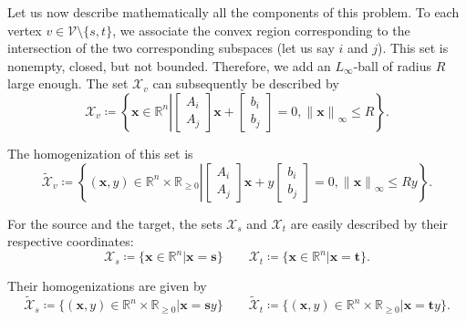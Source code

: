 \documentclass[a4paper, 12pt]{article}
\newlength{\indentsize}
\begin{document}
\hspace{\indentsize} Let us now describe mathematically all the components of this problem. To each vertex $v \in \mathcal{V}\setminus\{s,t\}$, we associate the convex region corresponding to the intersection of the two corresponding subspaces (let us say $i$ and $j$). This set is nonempty, closed, but not bounded. Therefore, we add an $L_{\infty}$-ball of radius $R$ large enough. The set $\mathcal{X}_v$ can subsequently be described by \[\mathcal{X}_v \coloneq \left\{\mathbf{x} \in \mathbb{R}^n \left\lvert \begin{bmatrix} A_i \\ A_j \end{bmatrix} \mathbf{x} + \begin{bmatrix} b_i \\ b_j \end{bmatrix} = 0, {\lVert \mathbf{x} \rVert}_\infty \leq R \right.\right\}.\]

The homogenization of this set is~\cite[eq. 2.5]{Tobia} \[\tilde{\mathcal{X}}_v \coloneq \left\{(\mathbf{x},y) \in \mathbb{R}^n \times \mathbb{R}_{\geq 0} \left\lvert \begin{bmatrix} A_i \\ A_j \end{bmatrix} \mathbf{x} + y \begin{bmatrix} b_i \\ b_j \end{bmatrix} = 0, {\lVert \mathbf{x} \rVert}_\infty \leq Ry \right.\right\}.\]

For the source and the target, the sets $\mathcal{X}_s$ and $\mathcal{X}_t$ are easily described by their respective coordinates: \[\mathcal{X}_s \coloneq \{\mathbf{x} \in \mathbb{R}^n \left\lvert \mathbf{x} = \mathbf{s}\right.\} \qquad \mathcal{X}_t \coloneq \{\mathbf{x} \in \mathbb{R}^n \left\lvert \mathbf{x} = \mathbf{t}\right.\}.\]

Their homogenizations are given by
\begin{equation}\label{eq:homogenizationSourceTarget}
    \tilde{\mathcal{X}}_s \coloneq \{(\mathbf{x},y) \in \mathbb{R}^n \times \mathbb{R}_{\geq 0} \left\lvert \mathbf{x} = \mathbf{s} y \right.\} \qquad \tilde{\mathcal{X}}_t \coloneq \{(\mathbf{x},y) \in \mathbb{R}^n \times \mathbb{R}_{\geq 0} \left\lvert \mathbf{x} = \mathbf{t} y \right.\}.
\end{equation}
\end{document}
